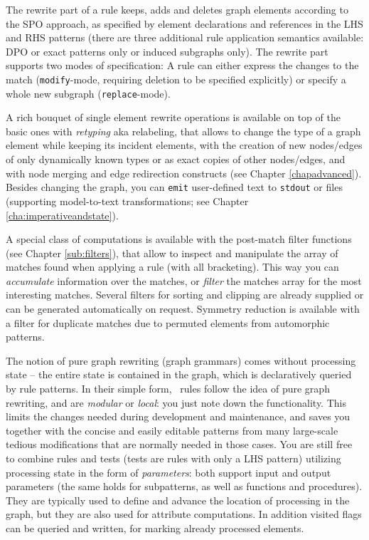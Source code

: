 The rewrite part of a rule keeps, adds and deletes graph elements according to the SPO approach, as specified by element declarations and references in the LHS and RHS patterns (there are three additional rule application semantics available: DPO or exact patterns only or induced subgraphs only).
The rewrite part supports two modes of specification: A rule can either express the changes to the match (\texttt{modify}-mode, requiring deletion to be specified explicitly) or specify a whole new subgraph (\texttt{replace}-mode).

A rich bouquet of single element rewrite operations is available on top of the basic ones with \emph{retyping} aka relabeling, that allows to change the type of a graph element while keeping its incident elements, with the creation of new nodes/edges of only dynamically known types or as exact copies of other nodes/edges, and with node merging and edge redirection constructs (see Chapter \ref{chapadvanced}).
Besides changing the graph, you can \texttt{emit} user-defined text to \texttt{stdout} or files (supporting model-to-text transformations; see Chapter \ref{cha:imperativeandstate}).

A special class of computations is available with the post-match filter functions (see Chapter \ref{sub:filters}), that allow to inspect and manipulate the array of matches found when applying a rule (with all bracketing). 
This way you can \emph{accumulate} information over the matches, or \emph{filter} the matches array for the most interesting matches.
Several filters for sorting and clipping are already supplied or can be generated automatically on request.
Symmetry reduction is available with a filter for duplicate matches due to permuted elements from automorphic patterns.

The notion of pure graph rewriting (graph grammars) comes without processing state -- the entire state is contained in the graph, which is declaratively queried by rule patterns.
In their simple form, \GrG\ rules follow the idea of pure graph rewriting, and are \emph{modular} or \emph{local}: you just note down the functionality.
This limits the changes needed during development and maintenance, and saves you together with the concise and easily editable patterns from many large-scale tedious modifications that are normally needed in those cases.
You are still free to combine rules and tests (tests are rules with only a LHS pattern) utilizing processing state in the form of \emph{parameters}: both support input and output parameters (the same holds for subpatterns, as well as functions and procedures).
They are typically used to define and advance the location of processing in the graph, but they are also used for attribute computations.
In addition visited flags can be queried and written, for marking already processed elements.

